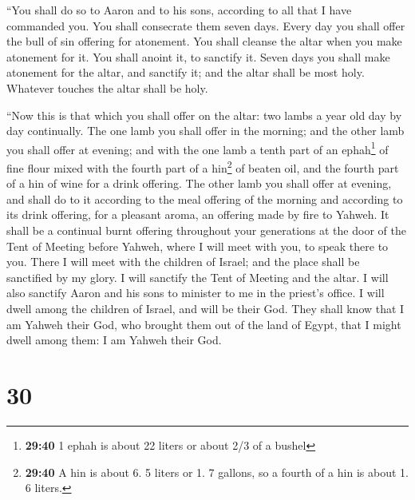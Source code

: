  ``You shall do so to Aaron and to his sons, according to
all that I have commanded you. You shall consecrate them seven days.
 Every day you shall offer the bull of sin offering for
atonement. You shall cleanse the altar when you make atonement for it.
You shall anoint it, to sanctify it.  Seven days you
shall make atonement for the altar, and sanctify it; and the altar shall
be most holy. Whatever touches the altar shall be holy.

 ``Now this is that which you shall offer on the altar:
two lambs a year old day by day continually.  The one
lamb you shall offer in the morning; and the other lamb you shall offer
at evening;  and with the one lamb a tenth part of an
ephah\footnote{\textbf{29:40} 1 ephah is about 22 liters or about 2/3 of
  a bushel} of fine flour mixed with the fourth part of a hin\footnote{\textbf{29:40}
  A hin is about 6. 5 liters or 1. 7 gallons, so a fourth of a hin is
  about 1. 6 liters.} of beaten oil, and the fourth part of a hin of
wine for a drink offering.  The other lamb you shall
offer at evening, and shall do to it according to the meal offering of
the morning and according to its drink offering, for a pleasant aroma,
an offering made by fire to Yahweh.  It shall be a
continual burnt offering throughout your generations at the door of the
Tent of Meeting before Yahweh, where I will meet with you, to speak
there to you.  There I will meet with the children of
Israel; and the place shall be sanctified by my glory.  I
will sanctify the Tent of Meeting and the altar. I will also sanctify
Aaron and his sons to minister to me in the priest's office.
 I will dwell among the children of Israel, and will be
their God.  They shall know that I am Yahweh their God,
who brought them out of the land of Egypt, that I might dwell among
them: I am Yahweh their God.

\hypertarget{section-29}{%
\section{30}\label{section-29}}

